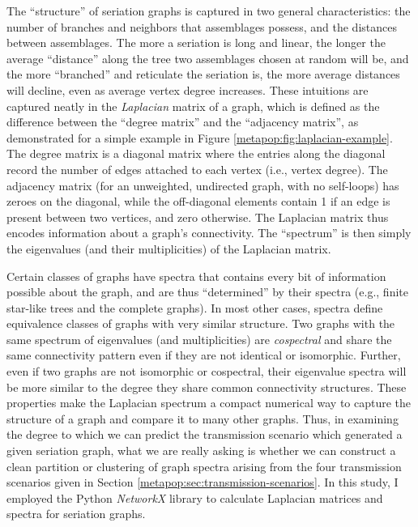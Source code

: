     The ``structure'' of seriation graphs is captured in two general characteristics:  the number of branches and neighbors that assemblages possess, and the distances between assemblages.  The more a seriation is long and linear, the longer the average ``distance'' along the tree two assemblages chosen at random will be, and the more ``branched'' and reticulate the seriation is, the more average distances will decline, even as average vertex degree increases.  These intuitions are captured neatly in the \emph{Laplacian} matrix of a graph, which is defined as the difference between the ``degree matrix'' and the ``adjacency matrix'', as demonstrated for a simple example in Figure \ref{metapop:fig:laplacian-example}.  The degree matrix is a diagonal matrix where the entries along the diagonal record the number of edges attached to each vertex (i.e., vertex degree).  The adjacency matrix (for an unweighted, undirected graph, with no self-loops) has zeroes on the  diagonal, while the off-diagonal elements contain 1 if an edge is present between two vertices, and zero otherwise.  The Laplacian matrix thus encodes information about a graph's connectivity.  The ``spectrum'' is then simply the eigenvalues (and their multiplicities) of the Laplacian matrix.  
    
    Certain classes of graphs have spectra that contains every bit of information possible about the graph, and are thus ``determined'' by their spectra (e.g., finite star-like trees and the complete graphs).  In most other cases, spectra define equivalence classes of graphs with very similar structure.  Two graphs with the same spectrum of eigenvalues (and multiplicities) are \emph{cospectral} and share the same connectivity pattern even if they are not identical or isomorphic.  Further, even if two graphs are not isomorphic or cospectral, their eigenvalue spectra will be more similar to the degree they share common connectivity structures.  These properties make the Laplacian spectrum a compact numerical way to capture the structure of a graph and compare it to many other graphs.  Thus, in examining the degree to which we can predict the transmission scenario which generated a given seriation graph, what we are really asking is whether we can construct a clean partition or clustering of graph spectra arising from the four transmission scenarios given in Section \ref{metapop:sec:transmission-scenarios}.  In this study, I employed the Python \emph{NetworkX} library to calculate Laplacian matrices and spectra for seriation graphs.
    
